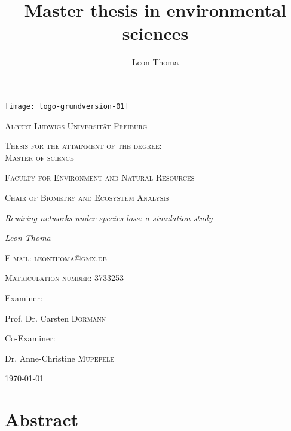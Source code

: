 \documentclass[12pt,a4paper]{article}
\author{Leon Thoma}
\title{Master thesis in environmental sciences}
\begin{document}
\begin{titlepage}
	\centering
	\texttt{[image: logo-grundversion-01]}\par\vspace{1cm}
	{\scshape\large Albert-Ludwigs-Universität Freiburg\par}
	\vspace{1.25cm}
	{\scshape\large Thesis for the attainment of the degree:\\ Master of science\par}
	\vspace{.75cm}
	{\scshape\large Faculty for Environment and Natural Resources\par}
	\vspace{.75cm}
	{\scshape\large Chair of Biometry and Ecosystem Analysis\par}
	\vspace{.75cm}
	{\Large\itshape Rewiring networks under species loss: a simulation
study
\par}
	\vspace{.75cm}
	{\Large\itshape Leon Thoma\par}
	\vspace{.25cm}
	{\scshape\normalsize E-mail: leonthoma@gmx.de\par}
	\vspace{.15cm}
	{\scshape\normalsize Matriculation number: 3733253\par}
	\vspace{.75cm}
	\large Examiner:\par
	\large Prof. Dr. Carsten  \textsc{Dormann} \par
	\vspace{.5cm}
	\large Co-Examiner:\par
	\large Dr. Anne-Christine \textsc{Mupepele}
	\vfill

	{\large \today\par}
\end{titlepage}
	\tableofcontents
	\newpage	
	\section{Abstract} 

\newpage%
%
%
\end{document}
